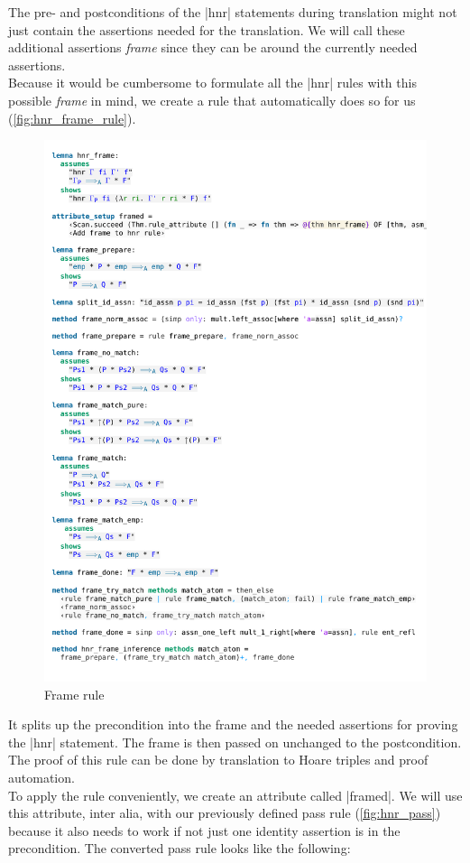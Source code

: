 The pre- and postconditions of the |hnr| statements during translation might not just contain the assertions needed for the translation. We will call these additional assertions \textit{frame} since they can be around the currently needed assertions. \\
Because it would be cumbersome to formulate all the |hnr| rules with this possible \textit{frame} in mind, we create a rule that automatically does so for us (\autoref{fig:hnr_frame_rule}).

\begin{figure}[htpb]
    \includegraphics[trim={0 26,2cm 0 0,5cm}, clip, width=1.00\textwidth]{figures/Theory_Hnr_Frame.pdf}
    \caption[Frame rule]{Frame rule}
    \label{fig:hnr_frame_rule}
\end{figure}

\noindent It splits up the precondition into the frame and the needed assertions for proving the |hnr| statement. The frame is then passed on unchanged to the postcondition.\\
The proof of this rule can be done by translation to Hoare triples and proof automation.\\
To apply the rule conveniently, we create an attribute called |framed|. We will use this attribute, inter alia, with our previously defined pass rule (\autoref{fig:hnr_pass}) because it also needs to work if not just one identity assertion is in the precondition.
The converted pass rule looks like the following:

